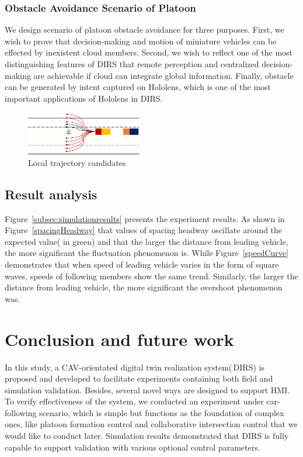 \documentclass[conference]{IEEEtran}
\begin{document}
\subsubsection{Obstacle Avoidance Scenario of Platoon }We design scenario of platoon obstacle avoidance for three purposes. First, we wish to prove that decision-making and motion of miniature vehicles can be effected by inexistent cloud members. Second, we wish to reflect one of the most distinguishing features of DIRS that remote perception and centralized decision-making are achievable if cloud can integrate global information. Finally, obstacle can be generated by intent captured on Hololens, which is one of the most important applications of Hololens in DIRS.

\begin{figure}
	\label{fig:obstacleAvoidance}
	\includegraphics[width=0.45\textwidth]{figure/obstacleAvoidance.png}
	\caption{Local trajectory candidates}
\end{figure}
\subsection{Result analysis}

	Figure~\ref{subsec:simulationresults} presents the experiment results. As shown in Figure~\ref{spacingHeadway} that values of spacing headway oscillate around the expected value( in green) and that the larger the distance from leading vehicle, the more significant the fluctuation phenomenon is. While Figure~\ref{speedCurve} demonstrates that when speed of leading vehicle varies in the form of square waves, speeds of following members show the same trend. Similarly, the larger the distance from leading vehicle, the more significant the overshoot phenomenon was.

\section{Conclusion and future work}
\label{sec:conclusion}
	In this study, a CAV-orientated digital twin realization system(\,DIRS) is proposed and developed to facilitate experiments containing both field and simulation validation. Besides, several novel ways are designed to support HMI. To verify effectiveness of the system, we conducted an experiment under car-following scenario, which is simple but functions as the foundation of complex ones, like platoon formation control and collaborative intersection control that we would like to conduct later. Simulation results demonstrated that DIRS is fully capable to support validation with various optional control parameters.
	
\end{document}
